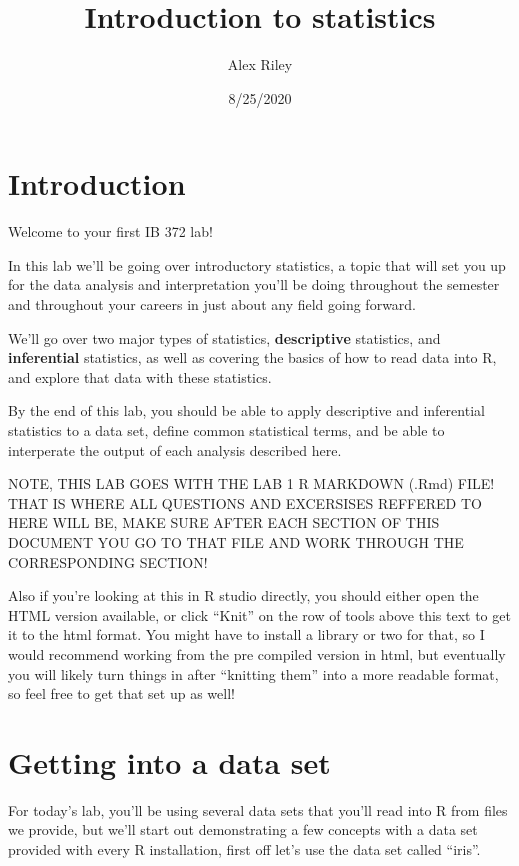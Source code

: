 \documentclass[
]{article}
\title{Introduction to statistics}
\author{Alex Riley}
\date{8/25/2020}
\begin{document}
\maketitle

\hypertarget{introduction}{%
\section{Introduction}\label{introduction}}

Welcome to your first IB 372 lab!

In this lab we'll be going over introductory statistics, a topic that
will set you up for the data analysis and interpretation you'll be doing
throughout the semester and throughout your careers in just about any
field going forward.

We'll go over two major types of statistics, \textbf{descriptive}
statistics, and \textbf{inferential} statistics, as well as covering the
basics of how to read data into R, and explore that data with these
statistics.

By the end of this lab, you should be able to apply descriptive and
inferential statistics to a data set, define common statistical terms,
and be able to interperate the output of each analysis described here.

NOTE, THIS LAB GOES WITH THE LAB 1 R MARKDOWN (.Rmd) FILE! THAT IS WHERE
ALL QUESTIONS AND EXCERSISES REFFERED TO HERE WILL BE, MAKE SURE AFTER
EACH SECTION OF THIS DOCUMENT YOU GO TO THAT FILE AND WORK THROUGH THE
CORRESPONDING SECTION!

Also if you're looking at this in R studio directly, you should either
open the HTML version available, or click ``Knit'' on the row of tools
above this text to get it to the html format. You might have to install
a library or two for that, so I would recommend working from the pre
compiled version in html, but eventually you will likely turn things in
after ``knitting them'' into a more readable format, so feel free to get
that set up as well!

\hypertarget{getting-into-a-data-set}{%
\section{Getting into a data set}\label{getting-into-a-data-set}}

For today's lab, you'll be using several data sets that you'll read into
R from files we provide, but we'll start out demonstrating a few
concepts with a data set provided with every R installation, first off
let's use the data set called ``iris''.
\end{document}
